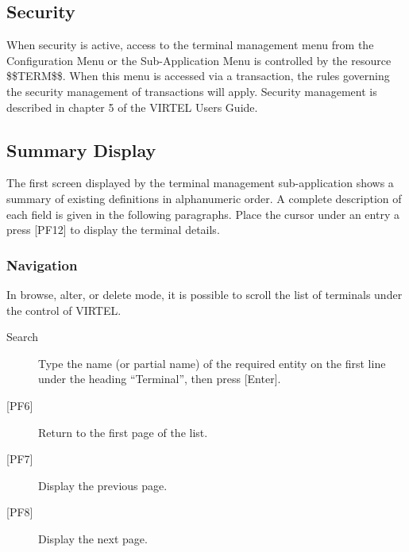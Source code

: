 \documentclass[letterpaper,10pt,english]{sphinxmanual}
\begin{document}
\subsection{Security}
\label{\detokenize{connectivity_guide:index-96}}\label{\detokenize{connectivity_guide:id49}}
When security is active, access to the terminal management menu from the Configuration Menu or the Sub-Application Menu is controlled by the resource \$\$TERM\$\$. When this menu is accessed via a transaction, the rules governing the security management of transactions will apply. Security management is described in chapter 5 of the VIRTEL Users Guide.

\ignorespaces 

\subsection{Summary Display}
\label{\detokenize{connectivity_guide:index-97}}\label{\detokenize{connectivity_guide:id50}}
The first screen displayed by the terminal management sub-application shows a summary of existing definitions in alphanumeric order. A complete description of each field is given in the following paragraphs. Place the cursor under an entry a press {[}PF12{]} to display the terminal details.


\ignorespaces 

\subsubsection{Navigation}
\label{\detokenize{connectivity_guide:index-98}}\label{\detokenize{connectivity_guide:id51}}
In browse, alter, or delete mode, it is possible to scroll the list of terminals under the control of VIRTEL.
\begin{description}
\item[{Search}] \leavevmode
Type the name (or partial name) of the required entity on the first line under the heading “Terminal”, then press {[}Enter{]}.

\item[{{[}PF6{]}}] \leavevmode
Return to the first page of the list.

\item[{{[}PF7{]}}] \leavevmode
Display the previous page.

\item[{{[}PF8{]}}] \leavevmode
Display the next page.

\end{description}
\end{document}
